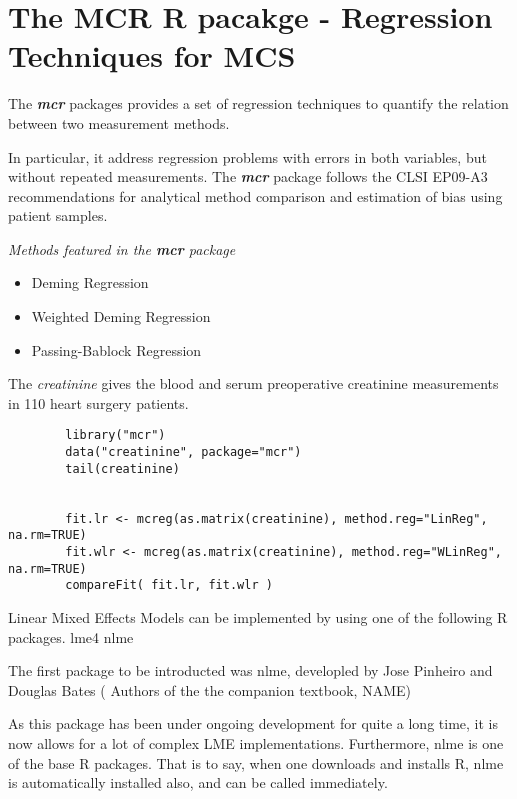 	\section{The MCR R pacakge - Regression Techniques for MCS}
	
	The \textbf{\textit{mcr}} packages provides a set of regression techniques to quantify the relation between two measurement methods.
	
	In particular, it address regression problems with errors in both variables, but without repeated measurements.
	The \textbf{\textit{mcr}} package follows the CLSI EP09-A3 recommendations for analytical
	method comparison and estimation of bias using patient samples.
	
	
	\textit{Methods featured in the \textbf{mcr} package}
	
	\begin{itemize}
		\item Deming Regression
		\item Weighted Deming Regression
		\item Passing-Bablock Regression
	\end{itemize}
	
	The \textit{creatinine} gives the blood and serum preoperative creatinine measurements in 110 heart surgery patients.
	
	\begin{framed}
		\begin{verbatim}
		library("mcr")
		data("creatinine", package="mcr")
		tail(creatinine)
		
		
		fit.lr <- mcreg(as.matrix(creatinine), method.reg="LinReg", na.rm=TRUE)
		fit.wlr <- mcreg(as.matrix(creatinine), method.reg="WLinReg", na.rm=TRUE)
		compareFit( fit.lr, fit.wlr )
		\end{verbatim}
	\end{framed}
	
	
\newpage

	Linear Mixed Effects Models can be implemented by using one of the following R packages.
	lme4
	nlme
	
	The first package to be introducted was nlme, developled by Jose Pinheiro and Douglas Bates ( Authors of the the companion textbook, NAME)
	
	As this package has been under ongoing development for quite a long time, it is now allows for a lot of complex LME implementations. 
	Furthermore, nlme is one of the base R packages.  That is to say, when one downloads and installs R, nlme is automatically installed also, and can be called immediately.
	
